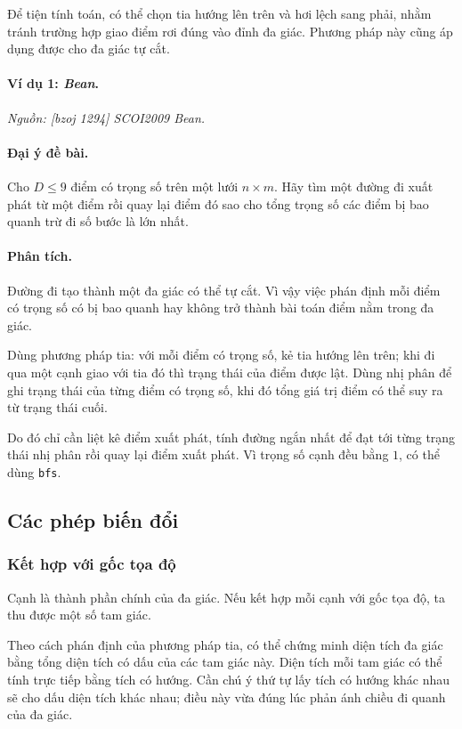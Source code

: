 \documentclass[11pt]{article}
\begin{document}
Để tiện tính toán, có thể chọn tia hướng lên trên và hơi lệch sang phải, nhằm
tránh trường hợp giao điểm rơi đúng vào đỉnh đa giác. Phương pháp này cũng áp
dụng được cho đa giác tự cắt.

\paragraph{Ví dụ 1: \emph{Bean}.}
\emph{Nguồn: [bzoj 1294] SCOI2009 Bean.}

\paragraph{Đại ý đề bài.}
Cho \(D\le9\) điểm có trọng số trên một lưới \(n\times m\). Hãy tìm một đường
đi xuất phát từ một điểm rồi quay lại điểm đó sao cho tổng trọng số các điểm bị
bao quanh trừ đi số bước là lớn nhất.

\paragraph{Phân tích.}
Đường đi tạo thành một đa giác có thể tự cắt. Vì vậy việc phán định mỗi điểm có
trọng số có bị bao quanh hay không trở thành bài toán điểm nằm trong đa giác.

Dùng phương pháp tia: với mỗi điểm có trọng số, kẻ tia hướng lên trên; khi đi
qua một cạnh giao với tia đó thì trạng thái của điểm được lật. Dùng nhị phân để
ghi trạng thái của từng điểm có trọng số, khi đó tổng giá trị điểm có thể suy ra
từ trạng thái cuối.

Do đó chỉ cần liệt kê điểm xuất phát, tính đường ngắn nhất để đạt tới từng trạng
thái nhị phân rồi quay lại điểm xuất phát. Vì trọng số cạnh đều bằng \(1\), có
thể dùng \texttt{bfs}.

\subsection{Các phép biến đổi}

\subsubsection{Kết hợp với gốc tọa độ}

Cạnh là thành phần chính của đa giác. Nếu kết hợp mỗi cạnh với gốc tọa độ, ta
thu được một số tam giác.

Theo cách phán định của phương pháp tia, có thể chứng minh diện tích đa giác
bằng tổng diện tích có dấu của các tam giác này. Diện tích mỗi tam giác có thể
tính trực tiếp bằng tích có hướng. Cần chú ý thứ tự lấy tích có hướng khác nhau
sẽ cho dấu diện tích khác nhau; điều này vừa đúng lúc phản ánh chiều đi quanh
của đa giác.
\end{document}
